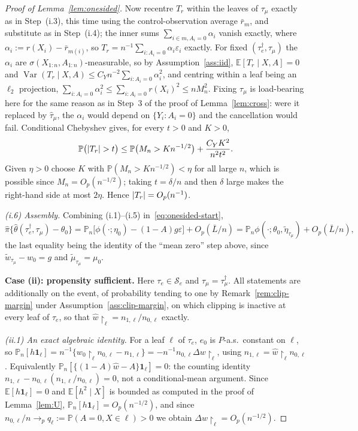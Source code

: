 \documentclass[11pt]{article}
\theoremstyle{plain}
\theoremstyle{definition}
\theoremstyle{remark}
\newcommand{\E}{\mathbb{E}}
\newcommand{\PP}{\mathbb{P}}
\newcommand{\Pn}{\mathbb{P}_n}
\newcommand{\cS}{\mathcal{S}}
\newcommand{\ez}{e_0}
\newcommand{\mz}{\mu_0}
\newcommand{\wz}{w_0}
\newcommand{\what}{\widehat{w}}
\newcommand{\that}{\widehat{\tau}}
\newcommand{\thetahat}{\widehat{\theta}}
\newcommand{\pihat}{\widehat{\pi}}
\DeclareMathOperator{\Var}{Var}
\DeclarePairedDelimiter{\abs}{\lvert}{\rvert}
\newcommand{\etatil}{\widetilde{\eta}}
\newcommand{\wtil}{\widetilde{w}}
\newcommand{\mtil}{\widetilde{\mu}}
\begin{document}
\begin{proof}[Proof of Lemma~\ref{lem:onesided}]
Now recentre $T_r$ within the leaves of $\tau_\mu$ exactly as in Step~(i.3),
this time using the control-observation average $\bar r_m$, and substitute as in
Step~(i.4); the inner sums $\sum_{i\in m,A_i=0}\alpha_i$ vanish exactly, where
$\alpha_i:=r(X_i)-\bar r_{m(i)}$, so
$T_r=n^{-1}\sum_{i:A_i=0}\alpha_i\varepsilon_i$ exactly. For fixed
$(\tau^\dagger_e,\tau_\mu)$ the $\alpha_i$ are
$\sigma(X_{1:n},A_{1:n})$-measurable, so by Assumption~\ref{ass:iid},
$\E[T_r\mid X,A]=0$ and
$\Var(T_r\mid X,A)\le C_Yn^{-2}\sum_{i:A_i=0}\alpha_i^2$, and centring within a
leaf being an $\ell_2$ projection,
$\sum_{i:A_i=0}\alpha_i^2\le\sum_{i:A_i=0}r(X_i)^2\le nM_n^2$. Fixing
$\tau_\mu$ is load-bearing here for the same reason as in Step~3 of the proof of
Lemma~\ref{lem:cross}: were it replaced by $\that_\mu$, the $\alpha_i$ would
depend on $\{Y_i:A_i=0\}$ and the cancellation would fail. Conditional
Chebyshev gives, for every $t>0$ and $K>0$,
\[
  \PP\bigl(\abs{T_r}>t\bigr)\le\PP\bigl(M_n>Kn^{-1/2}\bigr)
   +\frac{C_YK^2}{n^2t^2} .
\]
Given $\eta>0$ choose $K$ with $\PP(M_n>Kn^{-1/2})<\eta$ for all large $n$,
which is possible since $M_n=O_p(n^{-1/2})$; taking $t=\delta/n$ and then
$\delta$ large makes the right-hand side at most $2\eta$. Hence
$\abs{T_r}=O_p(n^{-1})$.

\emph{(i.6) Assembly.} Combining (i.1)--(i.5) in~\eqref{eq:onesided-start},
\[
  \pihat\{\thetahat(\tau^\dagger_e,\tau_\mu)-\theta_0\}
  =\Pn\bigl[\phi(\cdot;\eta_0)-(1-A)g\varepsilon\bigr]+O_p(\bar L/n)
  =\Pn\phi(\cdot;\theta_0,\etatil_{\tau_\mu})+O_p(\bar L/n),
\]
the last equality being the identity of the ``mean zero'' step above, since
$\wtil_{\tau_\mu}-\wz=g$ and $\mtil_{\tau_\mu}=\mz$.

\medskip
\noindent\textbf{Case (ii): propensity sufficient.} Here $\tau_e\in\cS_e$ and
$\tau_\mu=\tau^\dagger_\mu$. All statements are additionally on the event, of
probability tending to one by Remark~\ref{rem:clip-margin} under
Assumption~\ref{ass:clip-margin}, on which clipping is inactive at every leaf of
$\tau_e$, so that $\what\restriction_\ell=n_{1,\ell}/n_{0,\ell}$ exactly.

\emph{(ii.1) An exact algebraic identity.} For a leaf $\ell$ of $\tau_e$, $\ez$
is $P$-a.s.\ constant on $\ell$, so
$\Pn[h\mathbf1_\ell]
=n^{-1}\{\wz\restriction_\ell n_{0,\ell}-n_{1,\ell}\}
=-n^{-1}n_{0,\ell}\Delta w\restriction_\ell$, using
$n_{1,\ell}=\what\restriction_\ell n_{0,\ell}$. Equivalently
$\Pn[\{(1-A)\what-A\}\mathbf1_\ell]=0$: the counting identity
$n_{1,\ell}-n_{0,\ell}(n_{1,\ell}/n_{0,\ell})=0$, not a conditional-mean
argument. Since $\E[h\mathbf1_\ell]=0$ and $\E[h^2\mid X]$ is bounded as
computed in the proof of Lemma~\ref{lem:U}, $\Pn[h\mathbf1_\ell]=O_p(n^{-1/2})$,
and since $n_{0,\ell}/n\to_pq_\ell:=\PP(A=0,X\in\ell)>0$ we obtain
$\Delta w\restriction_\ell=O_p(n^{-1/2})$.


\end{proof}
\end{document}
